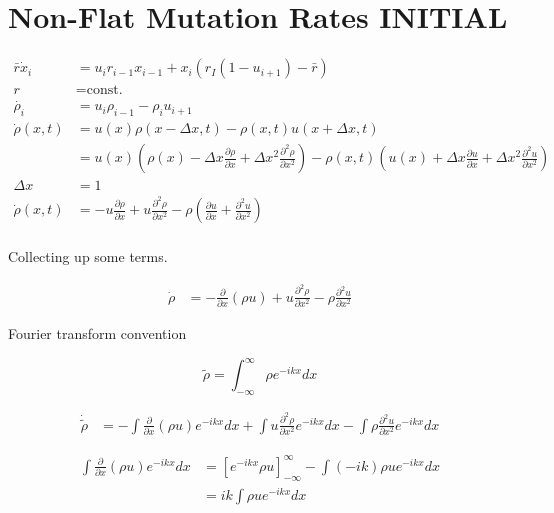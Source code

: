 \documentclass[a4paper]{article}
\begin{document}
\section{Non-Flat Mutation Rates INITIAL}

\begin{align*}
\bar{r} \dot{x}_i & = u_{i} r_{i-1} x_{i-1} + x_{i} ( r_I ( 1- u_{i+1} ) - \bar{r} ) \\
r & = \text{const.} \\
\dot{\rho _i} & = u_i \rho _{i-1} - \rho _{i} u_{i+1} \\
\dot{\rho} (x, t) & = u(x) \rho (x - \Delta x, t) - \rho (x,t) u(x + \Delta x , t) \\
& = u(x) \left( \rho (x) - \Delta x \frac{\partial \rho}{\partial x} + \Delta x ^2 \frac{\partial ^2 \rho}{\partial x ^ 2} \right) - \rho (x, t) \left( u(x) + \Delta x \frac{\partial u}{\partial x} + \Delta x ^2 \frac{\partial ^2 u }{\partial x ^2} \right) \\
\Delta x & = 1 \\
\dot{\rho} (x, t) & = - u \frac{\partial \rho}{\partial x} + u \frac{\partial ^2 \rho}{\partial x ^2} - \rho \left( \frac{\partial u}{\partial x} + \frac{\partial ^2 u}{\partial x ^2} \right) \\
\end{align*}

Collecting up some terms. 

\begin{align*}
\dot{\rho} & = - \frac{\partial}{\partial x} ( \rho u ) + u \frac{\partial ^2 \rho}{\partial x ^2} - \rho \frac{\partial ^2 u}{\partial x ^2}
\end{align*}

Fourier transform convention 

\begin{equation}
\tilde{\rho} = \int _{- \infty} ^{\infty} \rho e ^{-ikx } dx 
\end{equation}

\begin{align*}
\dot{\tilde{\rho}} & = - \int \frac{\partial}{\partial x} (\rho u) e^{-ikx} dx + \int u \frac{\partial ^2 \rho}{\partial x^2} e^{-ikx} dx - \int \rho \frac{\partial ^2 u}{\partial x ^2 } e^{-ikx} dx
\end{align*}

\begin{align*}
\int \frac{\partial}{\partial x} (\rho u) e^{-ikx} dx & = \left[ e^{-ikx} \rho u \right] _{-\infty} ^{\infty} - \int (-ik) \rho u e^{-ikx} dx \\
& = ik \int \rho u e^{-ikx} dx
\end{align*}
\end{document}
